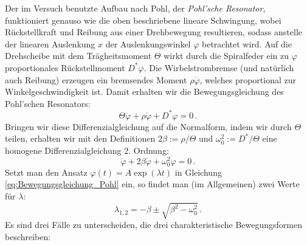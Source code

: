 Der im Versuch benutzte Aufbau nach Pohl, der \textit{Pohl'sche Resonator}, funktioniert genauso wie die oben beschriebene lineare Schwingung, wobei Rückstellkraft und Reibung aus einer Drehbewegung resultieren, sodass anstelle der linearen Auslenkung $x$ der Auslenkungswinkel $\varphi$ betrachtet wird. Auf die Drehscheibe mit dem Trägheitsmoment $\Theta$ wirkt durch die Spiralfeder ein zu $\varphi$ proportionales Rückstellmoment $D^*\varphi$. Die Wirbelstrombremse (und natürlich auch Reibung) erzeugen ein bremsendes Moment $\rho\dot{\varphi}$, welches proportional zur Winkelgeschwindigkeit ist. Damit erhalten wir die Bewegungsgleichung des Pohl'schen Resonators:
\begin{equation}
	\Theta\ddot{\varphi} + \rho\dot{\varphi} + D^*\varphi = 0\, .
\end{equation}
%
Bringen wir diese Differenzialgleichung auf die Normalform, indem wir durch $\Theta$ teilen, erhalten wir mit den Definitionen $2\beta := \rho /\Theta$ und $\omega_0^2 := D^* /\Theta$ eine homogene Differenzialgleichung 2. Ordnung:
\begin{equation}
	\ddot{\varphi} + 2\beta\dot{\varphi} + \omega_0^2 \varphi = 0 \, .
\label{eq:Bewegungsgleichung_Pohl}
\end{equation}
%
Setzt man den Ansatz $\varphi (t)= A \exp(\lambda t)$ in Gleichung \ref{eq:Bewegungsgleichung_Pohl} ein, so findet man (im Allgemeinen) zwei Werte für $\lambda$:
\begin{equation*}
	\lambda_{1,2} = -\beta \pm \sqrt{\beta^2 - \omega_0^2}\, .
\end{equation*}
%
Es sind drei Fälle zu unterscheiden, die drei charakteristische Bewegungsformen beschreiben:
